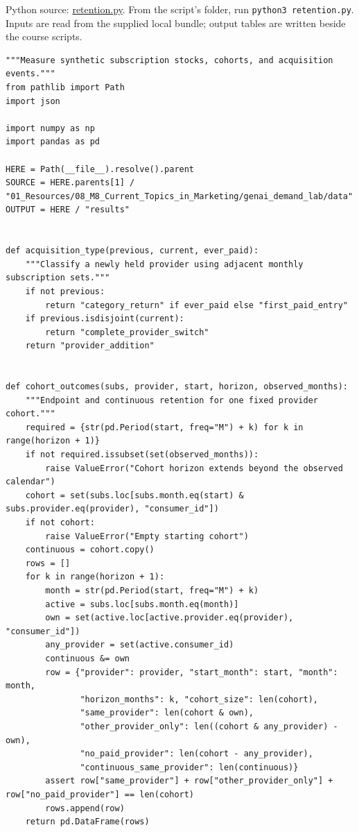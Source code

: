 \FloatBarrier
{}
Python source:
\href{../03_Data_and_Code/GenAI_Demand/retention.py}{retention.py}. From
the script's folder, run \texttt{python3\ retention.py}. Inputs are read
from the supplied local bundle; output tables are written beside the
course scripts.

\begin{Verbatim}[breaklines,breakanywhere,fontsize=\small]
"""Measure synthetic subscription stocks, cohorts, and acquisition events."""
from pathlib import Path
import json

import numpy as np
import pandas as pd

HERE = Path(__file__).resolve().parent
SOURCE = HERE.parents[1] / "01_Resources/08_M8_Current_Topics_in_Marketing/genai_demand_lab/data"
OUTPUT = HERE / "results"


def acquisition_type(previous, current, ever_paid):
    """Classify a newly held provider using adjacent monthly subscription sets."""
    if not previous:
        return "category_return" if ever_paid else "first_paid_entry"
    if previous.isdisjoint(current):
        return "complete_provider_switch"
    return "provider_addition"


def cohort_outcomes(subs, provider, start, horizon, observed_months):
    """Endpoint and continuous retention for one fixed provider cohort."""
    required = {str(pd.Period(start, freq="M") + k) for k in range(horizon + 1)}
    if not required.issubset(set(observed_months)):
        raise ValueError("Cohort horizon extends beyond the observed calendar")
    cohort = set(subs.loc[subs.month.eq(start) & subs.provider.eq(provider), "consumer_id"])
    if not cohort:
        raise ValueError("Empty starting cohort")
    continuous = cohort.copy()
    rows = []
    for k in range(horizon + 1):
        month = str(pd.Period(start, freq="M") + k)
        active = subs.loc[subs.month.eq(month)]
        own = set(active.loc[active.provider.eq(provider), "consumer_id"])
        any_provider = set(active.consumer_id)
        continuous &= own
        row = {"provider": provider, "start_month": start, "month": month,
               "horizon_months": k, "cohort_size": len(cohort),
               "same_provider": len(cohort & own),
               "other_provider_only": len((cohort & any_provider) - own),
               "no_paid_provider": len(cohort - any_provider),
               "continuous_same_provider": len(continuous)}
        assert row["same_provider"] + row["other_provider_only"] + row["no_paid_provider"] == len(cohort)
        rows.append(row)
    return pd.DataFrame(rows)



\end{Verbatim}
